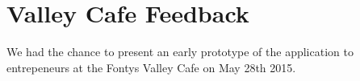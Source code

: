\section{Valley Cafe Feedback}
We had the chance to present an early prototype of the application to entrepeneurs at the Fontys Valley Cafe on May 28th 2015.
